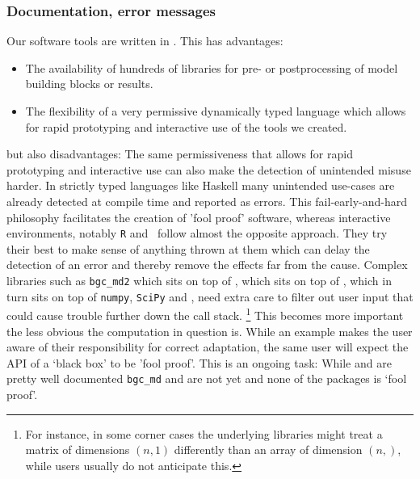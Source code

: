 \subsubsection{Documentation, error messages}
Our software tools are written in \python{}. 
This has advantages:
\begin{itemize}
  \item
  The availability of hundreds of libraries for pre-  or postprocessing of model building blocks or results.
  \item
  The flexibility of a very permissive dynamically typed language which allows for rapid prototyping and interactive use of the tools we created.
\end{itemize}
but also disadvantages: The same permissiveness that allows for rapid prototyping and interactive use can also make the detection of unintended misuse harder.
In strictly typed languages like Haskell many unintended use-cases are already detected at compile time and reported as errors.
This fail-early-and-hard philosophy facilitates the creation of 'fool proof'
software, whereas interactive environments, notably \texttt{R} and \python\ follow
almost the opposite approach.  They try their best to make sense of anything
thrown at them which can delay the detection of an error and thereby remove the effects far from the cause.
Complex libraries such as \texttt{bgc\_md2} which sits on top of \CompartmentalSystems{}, which sits on top of \LAPM{}, which in turn sits on top of \texttt{numpy}, \texttt{SciPy} and \sympy,
need extra care to filter out user input that could cause trouble further down the call stack. 
\footnote{For instance, in some corner cases the underlying libraries might treat a matrix of dimensions $(n,1)$ differently than an array of dimension $(n,)$, while users usually do not anticipate this.} This becomes more important the less obvious the computation in question is. 
While an example makes the user aware of their responsibility for correct adaptation, the same user will expect the API of a `black box' to be 'fool proof'. 
This is an ongoing task: While \LAPM{} and \CompartmentalSystems{} are pretty well documented 
\texttt{bgc\_md} and \ComputabilityGraphs{} are not yet and none of the packages is `fool proof'. 


